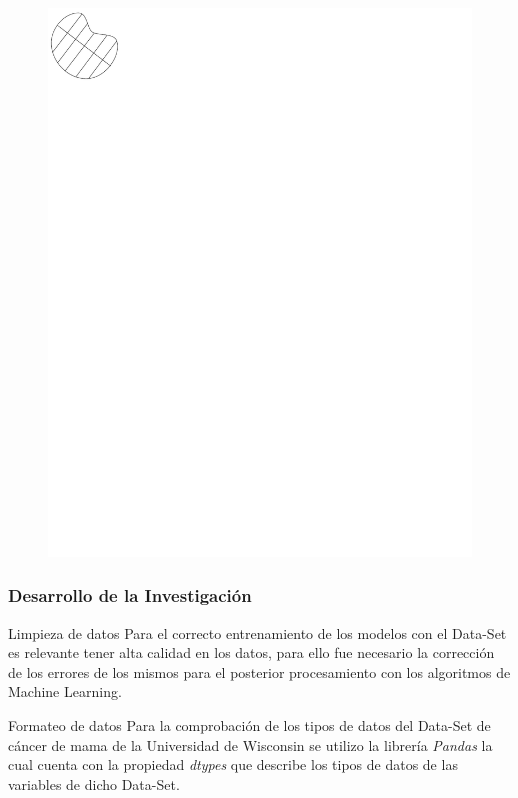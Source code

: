 \documentclass[xcolor=dvipsnames,xcolor=table]{beamer} %
\begin{document}
\begin{frame}
\begin{figure}[!htb]
		\endminipage\hfill
	    \includegraphics[width=1\linewidth]{PROYECTO/imgs/FnaClassification/Symmetry}
		\endminipage
	\end{figure}
\end{frame}

\begin{frame}
	\frametitle{Desarrollo de la Investigación}
	\begin{block}{Limpieza de datos}\justifying
		Para el correcto entrenamiento de los modelos con el Data-Set es relevante tener alta calidad  en los datos, para ello fue necesario la corrección de los errores de los mismos para el posterior procesamiento con  los algoritmos de Machine Learning.
	\end{block}
	
	\begin{block}{Formateo de datos}\justifying
		Para la comprobación de los tipos de datos del  Data-Set de cáncer de mama de la Universidad de Wisconsin se utilizo  la librería \textit{Pandas} la cual cuenta con la propiedad \textit{dtypes} que describe los tipos de datos de las variables de dicho Data-Set.
	\end{block}
\end{frame}
\end{document}
